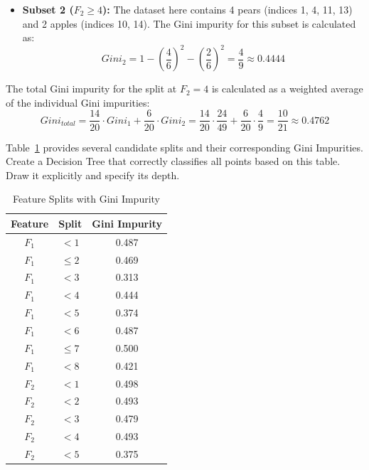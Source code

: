 \documentclass[12pt]{article}
\begin{document}
\begin{ejercicio}
\begin{itemize}
            \item \textbf{Subset 2 ($F_2 \geq 4$):} The dataset here contains 4 pears (indices 1, 4, 11, 13) and 2 apples (indices 10, 14). The Gini impurity for this subset is calculated as:
            \begin{equation*}
                Gini_2 = 1 - \left(\frac{4}{6}\right)^2 - \left(\frac{2}{6}\right)^2 = \dfrac{4}{9} \approx 0.4444
            \end{equation*}
        \end{itemize}

        The total Gini impurity for the split at $F_2 = 4$ is calculated as a weighted average of the individual Gini impurities:
        \begin{equation*}
            Gini_{total} = \frac{14}{20} \cdot Gini_1 + \frac{6}{20} \cdot Gini_2 = \frac{14}{20} \cdot \dfrac{24}{49} + \frac{6}{20} \cdot \dfrac{4}{9} = \dfrac{10}{21} \approx 0.4762
        \end{equation*}
    \end{ejercicio}

    \begin{ejercicio}
        Table~\ref{tab:feature_splits2} provides several candidate splits and their corresponding Gini Impurities. Create a Decision Tree that correctly classifies all points based on this table. Draw it explicitly and specify its depth.

        \begin{table}[h!]
        \centering
        \begin{tabular}{|c|c|c|}
        \hline
        \textbf{Feature} & \textbf{Split} & \textbf{Gini Impurity} \\ \hline
        $F_1$ & $<1$ & 0.487 \\ \hline
        $F_1$ & $\le 2$ & 0.469 \\ \hline
        $F_1$ & $<3$ & 0.313 \\ \hline
        $F_1$ & $<4$ & 0.444 \\ \hline
        $F_1$ & $<5$ & 0.374 \\ \hline
        $F_1$ & $<6$ & 0.487 \\ \hline
        $F_1$ & $\le 7$ & 0.500 \\ \hline
        $F_1$ & $<8$ & 0.421 \\ \hline
        $F_2$ & $<1$ & 0.498 \\ \hline
        $F_2$ & $<2$ & 0.493 \\ \hline
        $F_2$ & $<3$ & 0.479 \\ \hline
        $F_2$ & $<4$ & 0.493 \\ \hline
        $F_2$ & $<5$ & 0.375 \\ \hline
        \end{tabular}
        \caption{Feature Splits with Gini Impurity}
        \label{tab:feature_splits2}
        \end{table}
    \end{ejercicio}
\end{document}
